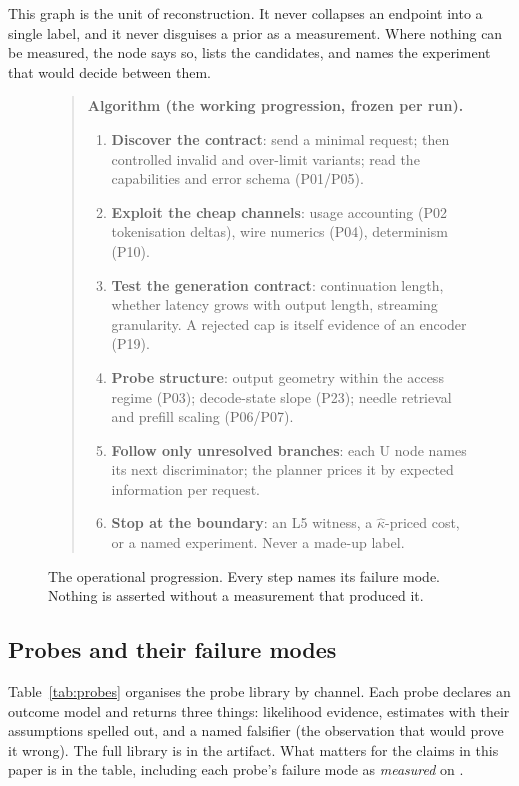 This graph is the unit of reconstruction.  It never collapses an endpoint into a single
label, and it never disguises a prior as a measurement.  Where nothing can be measured,
the node says so, lists the candidates, and names the experiment that would decide
between them.

\begin{figure}[t]
\begin{quote}\small
\textbf{Algorithm (the working progression, frozen per run).}
\begin{enumerate}[nosep,leftmargin=1.6em]
\item \textbf{Discover the contract}: send a minimal request; then controlled invalid
      and over-limit variants; read the capabilities and error schema (P01/P05).
\item \textbf{Exploit the cheap channels}: usage accounting (P02 tokenisation deltas),
      wire numerics (P04), determinism (P10).
\item \textbf{Test the generation contract}: continuation length, whether latency grows
      with output length, streaming granularity.  A rejected cap is itself evidence of an
      encoder (P19).
\item \textbf{Probe structure}: output geometry within the access regime (P03);
      decode-state slope (P23); needle retrieval and prefill scaling (P06/P07).
\item \textbf{Follow only unresolved branches}: each U node names its next
      discriminator; the planner prices it by expected information per request.
\item \textbf{Stop at the boundary}: an L5 witness, a $\hat\kappa$-priced cost, or a
      named experiment.  Never a made-up label.
\end{enumerate}
\end{quote}
\caption{The operational progression.  Every step names its failure mode.  Nothing is
asserted without a measurement that produced it.}
\label{fig:algorithm}
\end{figure}

\subsection{Probes and their failure modes}
Table~\ref{tab:probes} organises the probe library by channel.  Each probe declares an
outcome model and returns three things: likelihood evidence, estimates with their
assumptions spelled out, and a named falsifier (the observation that would prove it
wrong).  The full library is in the artifact.  What matters for the claims in this paper
is in the table, including each probe's failure mode as \emph{measured} on \benchname{}.


